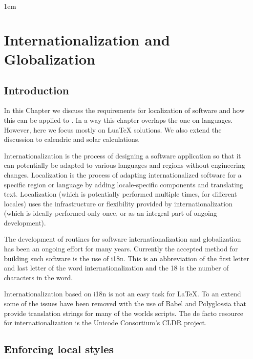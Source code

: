 \parindent1em

\chapter{Internationalization and Globalization}


\section{Introduction}

In this Chapter we discuss the requirements for localization of software and how this can be applied to \latex. In a way this chapter overlaps the one on languages. However, here we focus mostly on LuaTeX solutions. We also extend the discussion to calendric and solar calculations.

Internationalization is the process of designing a software application so that it can potentially be adapted to various languages and regions without engineering changes. Localization is the process of adapting internationalized software for a specific region or language by adding locale-specific components and translating text. Localization (which is potentially performed multiple times, for different locales) uses the infrastructure or flexibility provided by internationalization (which is ideally performed only once, or as an integral part of ongoing development).

The development of routines for software internationalization and globalization has been an ongoing effort for many years. Currently the accepted method for building such software is the use of i18n. This is an abbreviation of the first letter and last letter of the word internationalization and the 18 is the number of characters in the word.

Internationalization based on i18n is not an easy task for \LaTeX. To an extend some of the issues have been removed with the use of Babel and Polyglossia that provide translation strings for many of the worlds scripts. The de facto resource for internationalization is the Unicode Consortium’s \href{http://cldr.unicode.org/}{CLDR} project.

\section{Enforcing local styles}


